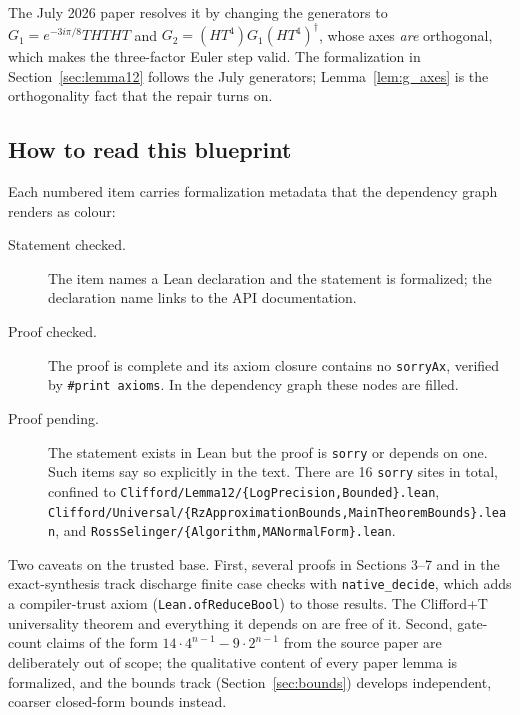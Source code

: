 The July 2026 paper resolves it by changing the generators to
$G_1 = e^{-3i\pi/8}THTHT$ and $G_2 = (HT^4)G_1(HT^4)^\dagger$, whose axes
\emph{are} orthogonal, which makes the three-factor Euler step valid.  The
formalization in Section~\ref{sec:lemma12} follows the July generators;
Lemma~\ref{lem:g_axes} is the orthogonality fact that the repair turns on.

\subsection{How to read this blueprint}

Each numbered item carries formalization metadata that the dependency graph
renders as colour:

\begin{description}
  \item[Statement checked.] The item names a Lean declaration and the
    statement is formalized; the declaration name links to the API
    documentation.
  \item[Proof checked.] The proof is complete and its axiom closure contains
    no \texttt{sorryAx}, verified by \texttt{\#print axioms}.  In the
    dependency graph these nodes are filled.
  \item[Proof pending.] The statement exists in Lean but the proof is
    \texttt{sorry} or depends on one.  Such items say so explicitly in the
    text.  There are 16 \texttt{sorry} sites in total, confined to
    \texttt{Clifford/Lemma12/\{LogPrecision,Bounded\}.lean},
    \texttt{Clifford/Universal/\{RzApproximationBounds,MainTheoremBounds\}.lean},
    and \texttt{RossSelinger/\{Algorithm,MANormalForm\}.lean}.
\end{description}

Two caveats on the trusted base.  First, several proofs in Sections 3--7 and
in the exact-synthesis track discharge finite case checks with
\texttt{native\_decide}, which adds a compiler-trust axiom
(\texttt{Lean.ofReduceBool}) to those results.  The Clifford+T universality
theorem and everything it depends on are free of it.  Second, gate-count
claims of the form $14 \cdot 4^{n-1} - 9 \cdot 2^{n-1}$ from the source paper
are deliberately out of scope; the qualitative content of every paper lemma is
formalized, and the bounds track (Section~\ref{sec:bounds}) develops
independent, coarser closed-form bounds instead.
